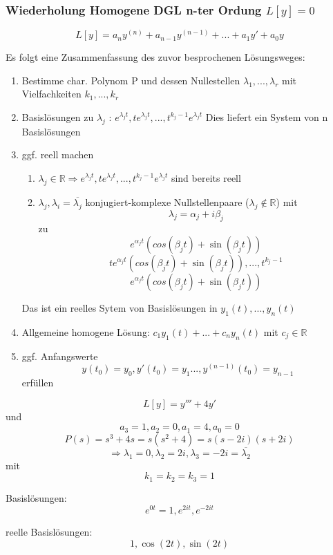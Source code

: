 \documentclass[10pt,a4paper]{article}
\begin{document}

\subsubsection*{Wiederholung Homogene DGL n-ter Ordung $L[y]=0$}

\begin{equation}
L[y] = a_n y^{(n)}+ a_{n-1} y^{(n-1)} + ... + a_1 y' + a_0 y
\end{equation}

Es folgt eine Zusammenfassung des zuvor besprochenen Lösungsweges:

\begin{enumerate}
\item Bestimme char. Polynom P und dessen Nullestellen $\lambda_1, ..., \lambda_r$ mit Vielfachkeiten  $k_1 , ..., k_r $
\item Basislösungen zu $\lambda_j$ : $e^{\lambda_j t},t e^{\lambda_j t}, ..., t^{k_j-1} e^{\lambda_j t} $ Dies liefert ein System von n Basislösungen
\item ggf. reell machen \begin{enumerate}
\item$\lambda_j \in \mathbb{R} \Rightarrow e^{\lambda_j t},t e^{\lambda_j t}, ..., t^{k_j-1} e^{\lambda_j t} $ sind bereits reell
\item $\lambda_j, \lambda_i = \overline{\lambda_j}$ konjugiert-komplexe Nullstellenpaare ($\lambda_j \notin \mathbb{R}$) mit $$\lambda_j= \alpha_j + i\beta_j $$ zu $$e^{\alpha_j t}(cos(\beta_j t)+\sin(\beta_j t))$$ $$ t e^{\alpha_j t}(cos(\beta_j t)+\sin(\beta_j t)), ..., t^{k_j-1}$$ $$ e^{\alpha_j t}(cos(\beta_j t)+\sin(\beta_j t))$$
\end{enumerate}
Das ist ein reelles Sytem von Basislösungen in $y_1(t), ..., y_n(t)$

\item Allgemeine homogene Lösung: $c_1 y_1(t) +  ... + c_n y_n(t)$ mit $c_j \in \mathbb{R}$
\item ggf. Anfangswerte $$y(t_0)=y_0, y'(t_0)=y_1 ..., y^{(n-1)}(t_0)=y_{n-1}$$ erfüllen 
\end{enumerate}

\begin{bsp}[$L{[}y{]} =y''' + 4y'$]
$$L[y]=y''' + 4y'$$ und $$a_3 =1, a_2=0, a_1=4,a_0=0$$ 
$$P(s)=s^{3}+4s=s(s^{2}+4)=s(s-2i)(s+2i)$$ $$ \Rightarrow \lambda_1 = 0, \lambda_2=2i, \lambda_3=-2i=\overline{\lambda_2}$$ mit $$k_1=k_2=k_3=1$$

Basislösungen: $$e^{0t}=1, e^{2it}, e^{-2it}$$

reelle Basislösungen: $$1, \cos(2t), \sin(2t)$$
\end{bsp}
\end{document}
